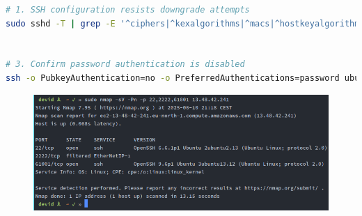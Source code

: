 \begin{lstlisting}[language=bash, label={annexes:ssh-hardening}, caption={SSH Service Hardening Validation}]  
# 1. SSH configuration resists downgrade attempts
sudo sshd -T | grep -E '^ciphers|^kexalgorithms|^macs|^hostkeyalgorithms'  


# 3. Confirm password authentication is disabled 
ssh -o PubkeyAuthentication=no -o PreferredAuthentications=password ubuntu@13.48.42.241 -p 61001  
\end{lstlisting}

\begin{figure}[h!]
    \centering
    \includegraphics[width=0.8\linewidth]{doc/img/annex_b_listing_3.png}
\end{figure}
\





\newpage

